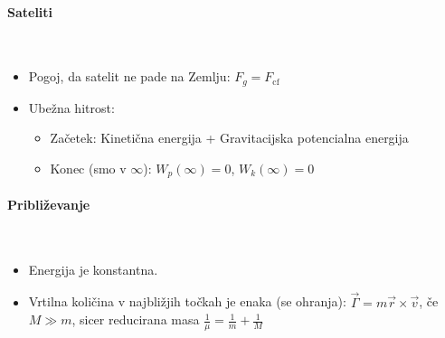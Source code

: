 \paragraph{Sateliti} \ 
\begin{itemize}
    \item Pogoj, da satelit ne pade na Zemlju: \(F_g = F_\text{cf}\)
    \item Ubežna hitrost:
    \begin{itemize}
        \item Začetek: Kinetična energija + Gravitacijska potencialna energija
        \item Konec (smo v \(\infty\)): \(W_p(\infty) = 0\), \(W_k(\infty) = 0\)
    \end{itemize}
\end{itemize}

\paragraph{Približevanje} \ 
\begin{itemize}
    \item Energija je konstantna.
    \item Vrtilna količina v najbližjih točkah je enaka (se ohranja): \(\vec{\Gamma} = m \vec{r} \times \vec{v}\), če \(M \gg m\), sicer reducirana masa \(\frac{1}{\mu} = \frac{1}{m} + \frac{1}{M}\)
\end{itemize}
